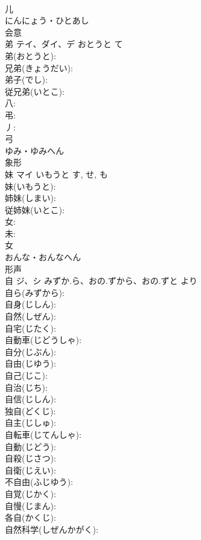 \documentclass[8pt]{extreport}
\begin{document}
\begin{CJK}{UTF8}{min}
\\	儿	
\\	にんにょう・ひとあし	
\\	会意 
\\	弟	テイ、ダイ、デ	おとうと	て	
\\	弟(おとうと): 
\\	兄弟(きょうだい): 
\\	弟子(でし): 
\\	従兄弟(いとこ): 
\\	八: 
\\	弔: 
\\	丿: 
\\	弓	
\\	ゆみ・ゆみへん	
\\	象形 
\\	妹	マイ	いもうと	す, せ, も	
\\	妹(いもうと): 
\\	姉妹(しまい): 
\\	従姉妹(いとこ): 
\\	女: 
\\	未: 
\\	女	
\\	おんな・おんなへん	
\\	形声 
\\	自	ジ、シ	みずか.ら、おの.ずから、おの.ずと	より	
\\	自ら(みずから): 
\\	自身(じしん): 
\\	自然(しぜん): 
\\	自宅(じたく): 
\\	自動車(じどうしゃ): 
\\	自分(じぶん): 
\\	自由(じゆう): 
\\	自己(じこ): 
\\	自治(じち): 
\\	自信(じしん): 
\\	独自(どくじ): 
\\	自主(じしゅ): 
\\	自転車(じてんしゃ): 
\\	自動(じどう): 
\\	自殺(じさつ): 
\\	自衛(じえい): 
\\	不自由(ふじゆう): 
\\	自覚(じかく): 
\\	自慢(じまん): 
\\	各自(かくじ): 
\\	自然科学(しぜんかがく): 

\end{CJK}
\end{document}
